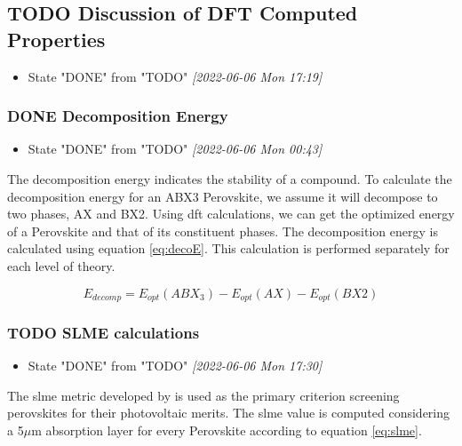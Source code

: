 \documentclass[twoside, twocolumn, 9pt, draft]{article}
\begin{document}
\subsection*{{\bfseries\sffamily TODO} Discussion of DFT Computed Properties}
\label{sec:org5b94c5f}
\begin{itemize}
\item State "DONE"       from "TODO"       \textit{[2022-06-06 Mon 17:19]}
\end{itemize}
\subsubsection*{{\bfseries\sffamily DONE} Decomposition Energy}
\label{sec:org65af7d0}
\begin{itemize}
\item State "DONE"       from "TODO"       \textit{[2022-06-06 Mon 00:43]}
\end{itemize}
The decomposition energy indicates the stability of a compound. To
calculate the decomposition energy for an ABX3 Perovskite, we assume
it will decompose to two phases, AX and BX2. Using \acrshort{dft} calculations,
we can get the optimized energy of a Perovskite and that of its
constituent phases. The decomposition energy is calculated using
equation \eqref{eq:decoE}. This calculation is performed separately for
each level of theory.

\begin{equation}\label{eq:decoE}
E_{decomp} = E_{opt}(ABX_3) - E_{opt}(AX) - E_{opt}(BX2)
\end{equation}

\subsubsection*{{\bfseries\sffamily TODO} SLME calculations}
\label{sec:orgacaffaa}
\begin{itemize}
\item State "DONE"       from "TODO"       \textit{[2022-06-06 Mon 17:30]}
\end{itemize}
The \gls{slme} metric developed by \citet{yu-2012-ident-poten} is used as the
primary criterion screening perovskites for their photovoltaic
merits. The \gls{slme} value is computed considering a 5\(\mu\)m absorption
layer for every Perovskite according to equation \eqref{eq:slme}.

\begin{equation}\label{eq:slme}

\end{equation}
\end{document}
